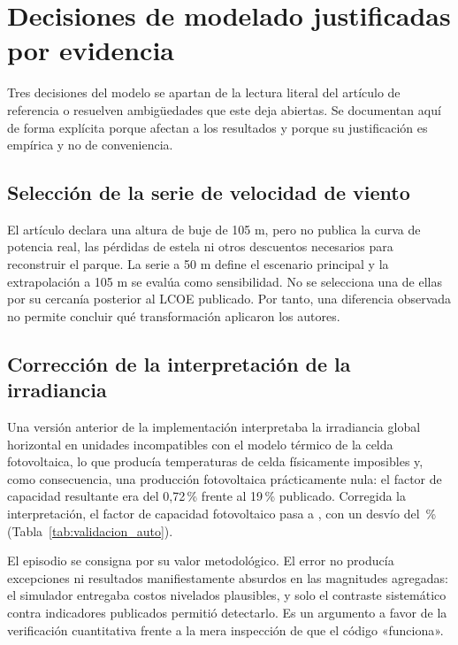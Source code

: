 \section{Decisiones de modelado justificadas por evidencia}
\label{sec:decisiones_modelado}

Tres decisiones del modelo se apartan de la lectura literal del artículo de referencia o resuelven ambigüedades que este deja abiertas. Se documentan aquí de forma explícita porque afectan a los resultados y porque su justificación es empírica y no de conveniencia.

\subsection{Selección de la serie de velocidad de viento}

El artículo declara una altura de buje de 105 m, pero no publica la curva de potencia real, las pérdidas de estela ni otros descuentos necesarios para reconstruir el parque. La serie a 50 m define el escenario principal y la extrapolación a 105 m se evalúa como sensibilidad. No se selecciona una de ellas por su cercanía posterior al LCOE publicado. Por tanto, una diferencia observada no permite concluir qué transformación aplicaron los autores.

\subsection{Corrección de la interpretación de la irradiancia}

Una versión anterior de la implementación interpretaba la irradiancia global horizontal en unidades incompatibles con el modelo térmico de la celda fotovoltaica, lo que producía temperaturas de celda físicamente imposibles y, como consecuencia, una producción fotovoltaica prácticamente nula: el factor de capacidad resultante era del 0,72\,\% frente al 19\,\% publicado. Corregida la interpretación, el factor de capacidad fotovoltaico pasa a \ReproCFPv, con un desvío del \ReproCFPvErr\,\% (Tabla~\ref{tab:validacion_auto}).

El episodio se consigna por su valor metodológico. El error no producía excepciones ni resultados manifiestamente absurdos en las magnitudes agregadas: el simulador entregaba costos nivelados plausibles, y solo el contraste sistemático contra indicadores publicados permitió detectarlo. Es un argumento a favor de la verificación cuantitativa frente a la mera inspección de que el código «funciona».

